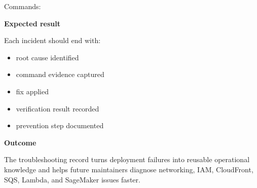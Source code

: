 Commands:

\begin{Shaded}
\begin{Highlighting}[]
\OperatorTok{=}
\OperatorTok{=}
\OperatorTok{=}
\OperatorTok{=}
\end{Highlighting}
\end{Shaded}

\vspace{0.5em}\noindent\textbf{Expected result}\par

Each incident should end with:

\begin{itemize}
\tightlist
\item
  root cause identified
\item
  command evidence captured
\item
  fix applied
\item
  verification result recorded
\item
  prevention step documented
\end{itemize}

\vspace{0.5em}\noindent\textbf{Outcome}\par

The troubleshooting record turns deployment failures into reusable
operational knowledge and helps future maintainers diagnose networking,
IAM, CloudFront, SQS, Lambda, and SageMaker issues faster.
